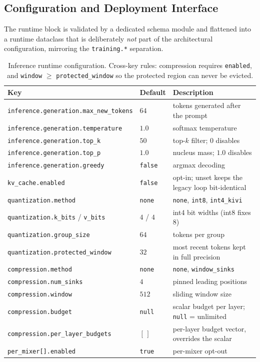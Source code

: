 \subsection{Configuration and Deployment Interface}
\label{sec:kv-config}

The runtime block is validated by a dedicated schema module and flattened into a runtime dataclass that is deliberately \emph{not} part of the architectural configuration, mirroring the \texttt{training.*} separation.

\begin{table}[H]
\centering
\small
\begin{tabularx}{0.98\linewidth}{l l X}
\toprule
\textbf{Key} & \textbf{Default} & \textbf{Description} \\
\midrule
\texttt{inference.generation.max\_new\_tokens} & $64$ & tokens generated after the prompt \\
\texttt{inference.generation.temperature} & $1.0$ & softmax temperature \\
\texttt{inference.generation.top\_k} & $50$ & top-$k$ filter; $0$ disables \\
\texttt{inference.generation.top\_p} & $1.0$ & nucleus mass; $1.0$ disables \\
\texttt{inference.generation.greedy} & \texttt{false} & argmax decoding \\
\midrule
\texttt{kv\_cache.enabled} & \texttt{false} & opt-in; unset keeps the legacy loop bit-identical \\
\texttt{quantization.method} & \texttt{none} & \texttt{none}, \texttt{int8}, \texttt{int4\_kivi} \\
\texttt{quantization.k\_bits} / \texttt{v\_bits} & $4$ / $4$ & int4 bit widths (int8 fixes 8) \\
\texttt{quantization.group\_size} & $64$ & tokens per group \\
\texttt{quantization.protected\_window} & $32$ & most recent tokens kept in full precision \\
\texttt{compression.method} & \texttt{none} & \texttt{none}, \texttt{window\_sinks} \\
\texttt{compression.num\_sinks} & $4$ & pinned leading positions \\
\texttt{compression.window} & $512$ & sliding window size \\
\texttt{compression.budget} & \texttt{null} & scalar budget per layer; \texttt{null} = unlimited \\
\texttt{compression.per\_layer\_budgets} & $[\,]$ & per-layer budget vector, overrides the scalar \\
\texttt{per\_mixer[].enabled} & \texttt{true} & per-mixer opt-out \\
\bottomrule
\end{tabularx}
\caption{Inference runtime configuration. Cross-key rules: compression requires \texttt{enabled}, and \texttt{window} $\ge$ \texttt{protected\_window} so the protected region can never be evicted.}
\label{tab:kv-config}
\end{table}


